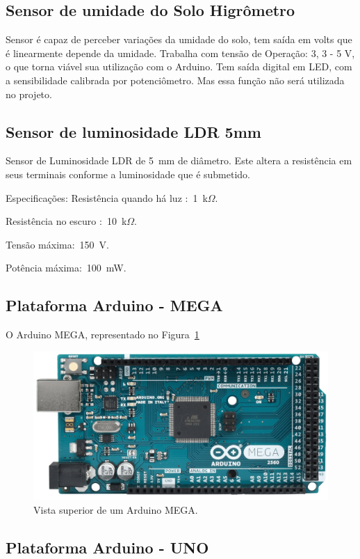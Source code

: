 \documentclass[a4paper,12pt]{report}
\begin{document}
		\subsection{Sensor de umidade do Solo Higrômetro}
		Sensor é capaz de perceber variações da umidade do solo, tem saída em volts que é linearmente depende da umidade.
		Trabalha com tensão de Operação: 3, 3 - 5 V, o que torna viável sua utilização com o Arduino. Tem saída digital em LED, com a sensibilidade calibrada por potenciômetro. Mas essa função não será utilizada no projeto.
	
		\subsection{Sensor de luminosidade LDR 5mm}
		
		Sensor de Luminosidade LDR de 5~mm de diâmetro. Este altera a resistência em seus terminais conforme a luminosidade que é submetido.
		
		Especificações:
		Resistência quando há luz :~1~k$\Omega$.
		
		Resistência no escuro :~10~k$\Omega$.
		
		Tensão máxima:~150~V.
		
		Potência máxima:~100~mW.
		
		\subsection{Plataforma Arduino - MEGA}	
		 
		O Arduino MEGA, representado no Figura~\ref{fig:MEGA}
		
		\begin{figure}[!h]
			\centering
			\includegraphics[width=0.6\linewidth]{figs/ARDUINO_MEGA_A03}
			\caption{Vista superior de um Arduino MEGA.}
			\label{fig:MEGA}
		\end{figure}
		
		\subsection{Plataforma Arduino - UNO}
			
\end{document}

